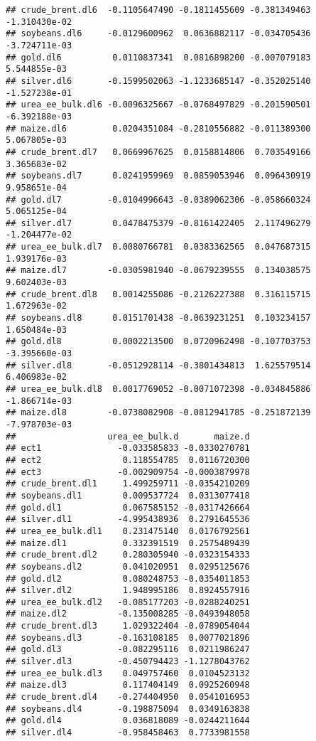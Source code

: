\documentclass[
]{article}
\begin{document}
\begin{verbatim}
## crude_brent.dl6  -0.1105647490 -0.1811455609 -0.381349463 -1.310430e-02
## soybeans.dl6     -0.0129600962  0.0636882117 -0.034705436 -3.724711e-03
## gold.dl6          0.0110837341  0.0816898200 -0.007079183  5.544855e-03
## silver.dl6       -0.1599502063 -1.1233685147 -0.352025140 -1.527238e-01
## urea_ee_bulk.dl6 -0.0096325667 -0.0768497829 -0.201590501 -6.392188e-03
## maize.dl6         0.0204351084 -0.2810556882 -0.011389300  5.067805e-03
## crude_brent.dl7   0.0669967625  0.0158814806  0.703549166  3.365683e-02
## soybeans.dl7      0.0241959969  0.0859053946  0.096430919  9.958651e-04
## gold.dl7         -0.0104996643 -0.0389062306 -0.058660324  5.065125e-04
## silver.dl7        0.0478475379 -0.8161422405  2.117496279 -1.204477e-02
## urea_ee_bulk.dl7  0.0080766781  0.0383362565  0.047687315  1.939176e-03
## maize.dl7        -0.0305981940 -0.0679239555  0.134038575  9.602403e-03
## crude_brent.dl8   0.0014255086 -0.2126227388  0.316115715  1.672963e-02
## soybeans.dl8      0.0151701438 -0.0639231251  0.103234157  1.650484e-03
## gold.dl8          0.0002213500  0.0720962498 -0.107703753 -3.395660e-03
## silver.dl8       -0.0512928114 -0.3801434813  1.625579514  6.406983e-02
## urea_ee_bulk.dl8  0.0017769052 -0.0071072398 -0.034845886 -1.866714e-03
## maize.dl8        -0.0738082908 -0.0812941785 -0.251872139 -7.978703e-03
##                  urea_ee_bulk.d       maize.d
## ect1               -0.033585833 -0.0330270781
## ect2                0.118554785  0.0116720300
## ect3               -0.002909754 -0.0003879978
## crude_brent.dl1     1.499259711 -0.0354210209
## soybeans.dl1        0.009537724  0.0313077418
## gold.dl1            0.067585152 -0.0317426664
## silver.dl1         -4.995438936  0.2791645536
## urea_ee_bulk.dl1    0.231475140  0.0176792561
## maize.dl1           0.332391519  0.2575489439
## crude_brent.dl2     0.280305940 -0.0323154333
## soybeans.dl2        0.041020951  0.0295125676
## gold.dl2            0.080248753 -0.0354011853
## silver.dl2          1.948995186  0.8924557916
## urea_ee_bulk.dl2   -0.085177203 -0.0288240251
## maize.dl2          -0.135008285 -0.0493948058
## crude_brent.dl3     1.029322404 -0.0789054044
## soybeans.dl3       -0.163108185  0.0077021896
## gold.dl3           -0.082295116  0.0211986247
## silver.dl3         -0.450794423 -1.1278043762
## urea_ee_bulk.dl3    0.049757460  0.0104523132
## maize.dl3           0.117404149  0.0925260948
## crude_brent.dl4    -0.274404950  0.0541016953
## soybeans.dl4       -0.198875094  0.0349163838
## gold.dl4            0.036818089 -0.0244211644
## silver.dl4         -0.958458463  0.7733981558

\end{verbatim}
\end{document}
